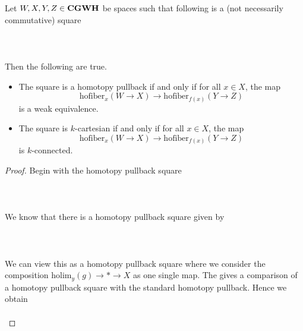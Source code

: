 \documentclass[a4paper]{article}
\begin{document}
\begin{prp}{}{} Let $W,X,Y,Z\in\bold{CGWH}$ be spaces such that following is a (not necessarily commutative) square \\~\\
\\~\\
Then the following are true. 
\begin{itemize}
\item The square is a homotopy pullback if and only if for all $x\in X$, the map $$\text{hofiber}_x(W\to X)\to\text{hofiber}_{f(x)}(Y\to Z)$$ is a weak equivalence. 
\item The square is $k$-cartesian if and only if for all $x\in X$, the map $$\text{hofiber}_x(W\to X)\to\text{hofiber}_{f(x)}(Y\to Z)$$ is $k$-connected. 
\end{itemize} \tcbline
\begin{proof}
Begin with the homotopy pullback square \\~\\
\\~\\
We know that there is a homotopy pullback square given by \\~\\
\\~\\
We can view this as a homotopy pullback square where we consider the composition $\text{holim}_y(g)\to\ast\to X$ as one single map. The gives a comparison of a homotopy pullback square with the standard homotopy pullback. Hence we obtain \\~\\

\end{proof}
\end{prp}
\end{document}
